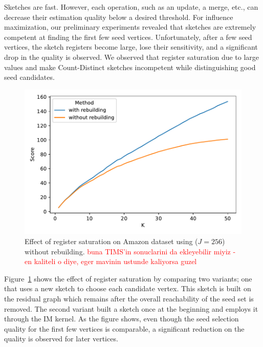 \documentclass[10pt,journal,compsoc]{IEEEtran}
\newcommand\acro{{\sc{HyperFuseR\xspace}\xspace}\xspace}
\newcommand\kktodo[1]{\textcolor{red}{#1}}
\begin{document}
Sketches are fast. However, each operation, such as an update, a merge, etc., can decrease their estimation quality below a desired threshold. For influence maximization, our preliminary experiments revealed that sketches are extremely competent at finding the first few seed vertices. Unfortunately, after a few seed vertices, the sketch registers become large, lose their sensitivity, and a significant drop in the quality is observed. We observed that register saturation due to large values and  make Count-Distinct sketches incompetent while distinguishing good seed candidates. 

\begin{figure}[!ht]
    \begin{center}
    \includegraphics[width=0.8\linewidth]{images/sketch-saturation.pdf}
    \caption{ Effect of register saturation on Amazon dataset using \acro($J=256$) without rebuilding. \kktodo{buna TIMS'in sonuclarini da ekleyebilir miyiz - en kaliteli o diye, eger mavinin ustunde kaliyorsa guzel}
     }\label{fig:sketch-saturation} 
    \end{center}
\end{figure}

Figure~\ref{fig:sketch-saturation} shows the effect of register saturation by comparing two \acro variants; one that uses a new sketch to choose each candidate vertex. This sketch is built on the residual graph which remains after the overall reachability of the seed set is removed. The second variant built a  sketch once at the beginning and employs it through the IM kernel. As the figure shows, even though the seed selection quality for the first few vertices is comparable, a significant reduction on the quality is observed for later vertices.  
\end{document}
